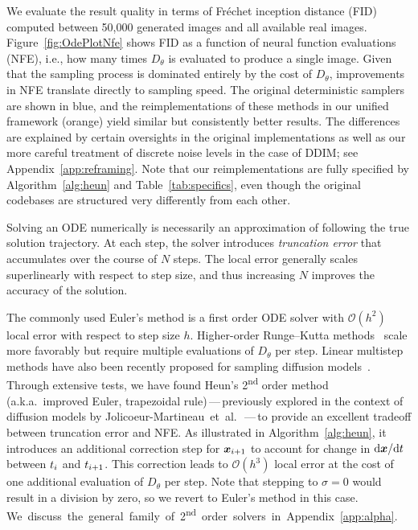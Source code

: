 \documentclass{article}
\begin{document}
We evaluate the result quality in terms of Fr\'echet inception distance (FID) \cite{Heusel2017} computed between 50,000 generated images and all available real images.
Figure~\ref{fig:OdePlotNfe} shows FID as a function of neural function evaluations (NFE), i.e., how many times $D_\theta$ is evaluated to produce a single image.
Given that the sampling process is dominated entirely by the cost of $D_\theta$, improvements in NFE translate directly to sampling speed.
The original deterministic samplers are shown in blue, and the reimplementations of these methods in our unified framework (orange) yield similar but consistently better results.
The differences are explained by certain oversights in the original implementations as well as our more careful treatment of discrete noise levels in the case of DDIM; see Appendix~\ref{app:reframing}.
Note that our reimplementations are fully specified by Algorithm~\ref{alg:heun} and Table~\ref{tab:specifics}, even though the original codebases are structured very differently from each other.

Solving an ODE numerically is necessarily an approximation of following the true solution trajectory.
At each step, the solver introduces \emph{truncation error} that accumulates over the course of $N$ steps.
The local error generally scales superlinearly with respect to step size, and thus increasing $N$ improves the accuracy of the solution.

The commonly used Euler's method is a first order ODE solver with $\mathcal{O}(h^2)$ local error with respect to step size $h$.
Higher-order Runge--Kutta methods~\cite{Suli2003} scale more favorably but require multiple evaluations of $D_\theta$ per step.
{Linear multistep methods have also been recently proposed for sampling diffusion models~\cite{Liu2022pseudo,Zhang2022exp}.}
Through extensive tests, we have found Heun's 2\textsuperscript{nd} order method~\cite{Ascher1998} (a.k.a.~improved Euler, trapezoidal rule)\,---\,previously explored in the context of diffusion models by Jolicoeur-Martineau~et~al.~\cite{Jolicoeur2021}\,---\,to provide an excellent tradeoff between truncation error and NFE.
As illustrated in Algorithm~\ref{alg:heun}, it introduces an additional correction step for $\boldsymbol{x}_{i+1}$ to account for change in $\mathrm{d}\boldsymbol{x} / \mathrm{d}t$ between $t_i$ and $t_{i+1}$. %
This correction leads to $\mathcal{O}(h^3)$ local error at the cost of one additional evaluation of $D_\theta$ per step.
Note that stepping to $\sigma=0$ would result in a division by zero, so we revert to Euler's method in this case.
\mbox{We discuss the general family of 2\textsuperscript{nd} order solvers in Appendix~{\ref{app:alpha}}.} %
\end{document}
